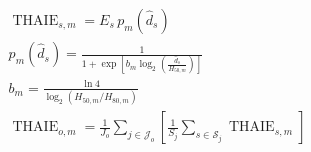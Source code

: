 \documentclass[border=8pt]{standalone}
\begin{document}
\color{ink}
$\begin{aligned}
\operatorname{THAIE}_{s,m}=E_s\,p_m\!\left(\widehat d_s\right)\\[15pt]
p_m\!\left(\widehat d_s\right)=\frac{1}{1+\exp\!\left[b_m\log_2\!\left(\frac{\widehat d_s}{H_{50,m}}\right)\right]}\\[15pt]
b_m=\frac{\ln 4}{\log_2\!\left(H_{50,m}/H_{80,m}\right)}\\[15pt]
\operatorname{THAIE}_{o,m}=\frac{1}{J_o}\sum_{j\in\mathcal J_o}\left[\frac{1}{S_j}\sum_{s\in\mathcal S_j}\operatorname{THAIE}_{s,m}\right]
\end{aligned}$
\end{document}
